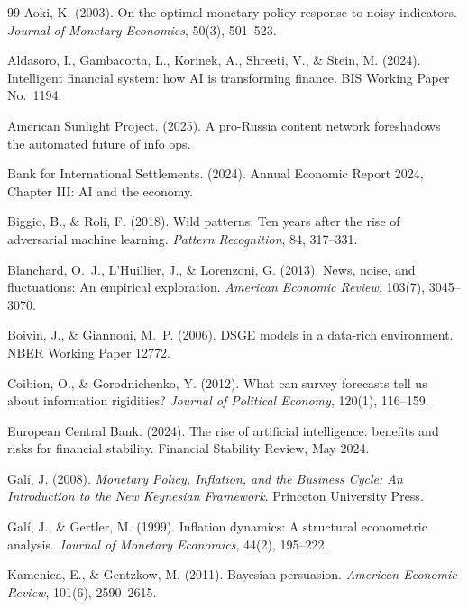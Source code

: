 \documentclass[12pt]{article}
\begin{document}
\begin{thebibliography}{99}
Aoki, K. (2003). On the optimal monetary policy response to noisy indicators. \emph{Journal of Monetary Economics}, 50(3), 501--523.

Aldasoro, I., Gambacorta, L., Korinek, A., Shreeti, V., \& Stein, M. (2024). Intelligent financial system: how AI is transforming finance. BIS Working Paper No.\ 1194.

American Sunlight Project. (2025). A pro-Russia content network foreshadows the automated future of info ops.

Bank for International Settlements. (2024). Annual Economic Report 2024, Chapter III: AI and the economy.

Biggio, B., \& Roli, F. (2018). Wild patterns: Ten years after the rise of adversarial machine learning. \emph{Pattern Recognition}, 84, 317--331.

Blanchard, O.\ J., L'Huillier, J., \& Lorenzoni, G. (2013). News, noise, and fluctuations: An empirical exploration. \emph{American Economic Review}, 103(7), 3045--3070.

Boivin, J., \& Giannoni, M.\ P. (2006). DSGE models in a data-rich environment. NBER Working Paper 12772.

Coibion, O., \& Gorodnichenko, Y. (2012). What can survey forecasts tell us about information rigidities? \emph{Journal of Political Economy}, 120(1), 116--159.

European Central Bank. (2024). The rise of artificial intelligence: benefits and risks for financial stability. Financial Stability Review, May 2024.

Galí, J. (2008). \emph{Monetary Policy, Inflation, and the Business Cycle: An Introduction to the New Keynesian Framework}. Princeton University Press.

Galí, J., \& Gertler, M. (1999). Inflation dynamics: A structural econometric analysis. \emph{Journal of Monetary Economics}, 44(2), 195--222.

Kamenica, E., \& Gentzkow, M. (2011). Bayesian persuasion. \emph{American Economic Review}, 101(6), 2590--2615.


\end{thebibliography}
\end{document}
